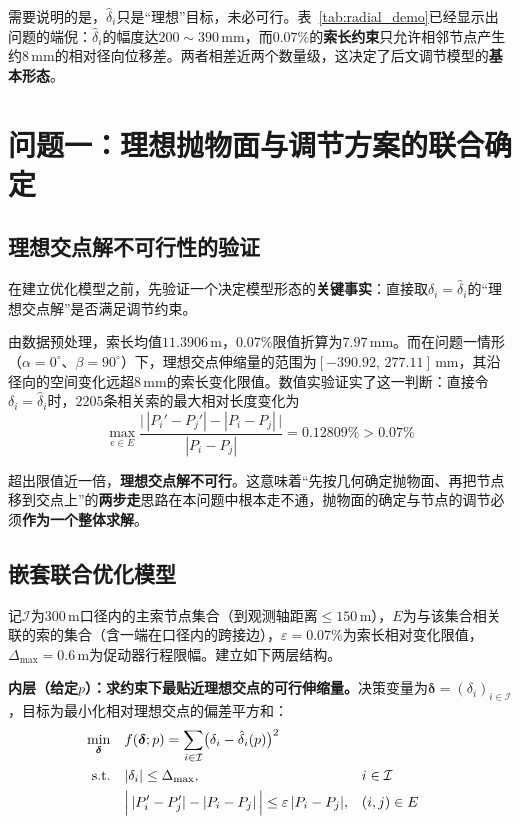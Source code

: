 \documentclass[withoutpreface]{cumcmthesis}
\begin{document}
需要说明的是，$\hat{\delta}_i$只是``理想''目标，未必可行。表~\ref{tab:radial_demo}已经显示出问题的端倪：$\hat{\delta}_i$的幅度达$200\sim390\,\mathrm{mm}$，而$0.07\%$的\textbf{索长约束}只允许相邻节点产生约$8\,\mathrm{mm}$的相对径向位移差。两者相差近两个数量级，这决定了后文调节模型的\textbf{基本形态}。

\section{问题一：理想抛物面与调节方案的联合确定}\label{sec:nested}

\subsection{理想交点解不可行性的验证}

在建立优化模型之前，先验证一个决定模型形态的\textbf{关键事实}：直接取$\delta_i=\hat{\delta}_i$的``理想交点解''是否满足调节约束。

由数据预处理，索长均值$11.3906\,\mathrm{m}$，$0.07\%$限值折算为$7.97\,\mathrm{mm}$。而在问题一情形（$\alpha=0^{\circ}$、$\beta=90^{\circ}$）下，理想交点伸缩量的范围为$[-390.92,\,277.11]\,\mathrm{mm}$，其沿径向的空间变化远超$8\,\mathrm{mm}$的索长变化限值。数值实验证实了这一判断：直接令$\delta_i=\hat{\delta}_i$时，$2205$条相关索的最大相对长度变化为
\begin{equation}
\max_{e\in E}\frac{\bigl|\,|P_i'-P_j'|-|P_i-P_j|\,\bigr|}{|P_i-P_j|}=0.12809\%>0.07\%
\end{equation}

超出限值近一倍，\textbf{理想交点解不可行}。这意味着``先按几何确定抛物面、再把节点移到交点上''的\textbf{两步走}思路在本问题中根本走不通，抛物面的确定与节点的调节必须\textbf{作为一个整体求解}。

\subsection{嵌套联合优化模型}

记$\mathcal{I}$为$300\,\mathrm{m}$口径内的主索节点集合（到观测轴距离$\le150\,\mathrm{m}$），$E$为与该集合相关联的索的集合（含一端在口径内的跨接边），$\varepsilon=0.07\%$为索长相对变化限值，$\Delta_{\max}=0.6\,\mathrm{m}$为促动器行程限幅。建立如下两层结构。

\textbf{内层（给定$p$）：求约束下最贴近理想交点的可行伸缩量。}决策变量为$\boldsymbol{\delta}=(\delta_i)_{i\in\mathcal{I}}$，目标为最小化相对理想交点的偏差平方和：
\begin{subequations}\label{eq:inner}
\begin{align}
\min_{\boldsymbol{\delta}}\quad & f(\boldsymbol{\delta};p)=\sum_{i\in\mathcal{I}}\bigl(\delta_i-\hat{\delta}_i(p)\bigr)^{2}\label{eq:inner_obj}\\
\text{s.t.}\quad & |\delta_i|\le\Delta_{\max}, && i\in\mathcal{I}\label{eq:inner_c1}\\
& \Bigl|\,|P_i'-P_j'|-|P_i-P_j|\,\Bigr|\le\varepsilon\,|P_i-P_j|, && (i,j)\in E\label{eq:inner_c2}
\end{align}
\end{subequations}
\end{document}

